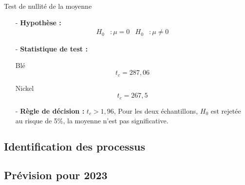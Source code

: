     Test de nullité de la moyenne
    \begin{itemize}
        \item[-]\textbf{Hypothèse :}
    \begin{align*}
        H_{0} &: \mu = 0 & H_{0} &: \mu \neq 0
    \end{align*}
    \item[-]\textbf{Statistique de test :}
    \begin{multicols}{2}
        \centering Blé
        \begin{equation*}
                t_{c} = 287,06
        \end{equation*}
    
        \columnbreak
    
        \centering Nickel
        \begin{equation*}
            t_{c} = 267,5
        \end{equation*}
        \end{multicols}
    \item[-]\textbf{Règle de décision :} $t_{c} > 1,96$, Pour les deux échantillons, $H_{0}$ est rejetée au risque de 5\%, la moyenne n'est pas significative.
    \end{itemize}
\subsection{Identification des processus}
\subsection{Prévision pour 2023}